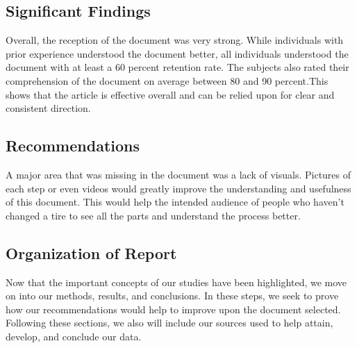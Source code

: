 \documentclass[12pt,A4paper]{article}
\begin{document}
		\subsection{Significant Findings}
		Overall, the reception of the document was very strong. While individuals with prior experience understood the document better, all individuals understood the document with at least a 60 percent retention rate. The subjects also rated their comprehension of the document on average between 80 and 90 percent.This shows that the article is effective overall and can be relied upon for clear and consistent direction. 

		\subsection{Recommendations}
		A major area that was missing in the document was a lack of visuals. Pictures of each step or even videos would greatly improve the understanding and usefulness of this document. This would help the intended audience of people who haven’t changed a tire to see all the parts and understand the process better.

		\subsection{Organization of Report}
		Now that the important concepts of our studies have been highlighted, we move on into our methods, results, and conclusions. In these steps, we seek to prove how our recommendations would help to improve upon the document selected. Following these sections, we also will include our sources used to help attain, develop, and conclude our data.
\end{document}
